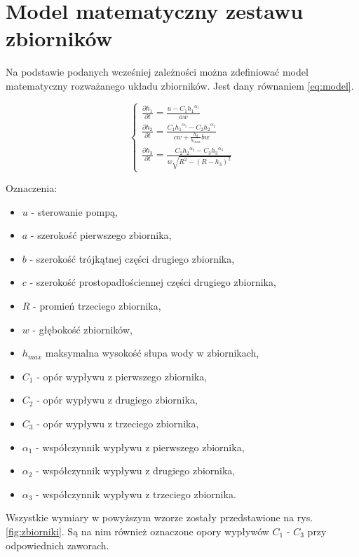 \section{Model matematyczny zestawu zbiorników}
\label{sec:model}

Na podstawie podanych wcześniej zależności można zdefiniować model matematyczny rozważanego układu zbiorników.
Jest dany równaniem \ref{eq:model}.

\begin{equation}\label{eq:model}
\left \{
\begin{array}{lr}
\frac{\partial h_{1}}{\partial t} = \frac{u - C_{1}{h_{1}}^{\alpha_{1}}}{aw} \\[8pt]
\frac{\partial h_{2}}{\partial t} = \frac{C_{1}{h_{1}}^{\alpha_{1}} -  C_{2}{h_{2}}^{\alpha_{2}}}{cw + \frac{h_{2}}{h_{max}}bw} \\[20pt]
\frac{\partial h_{3}}{\partial t} = \frac{C_{2}{h_{2}}^{\alpha_{2}} -  C_{3}{h_{3}}^{\alpha_{3}}}{w\sqrt{R^{2} - (R - h_{3})^{2}}}
\end{array}
\right.
\end{equation}

Oznaczenia:
\begin{itemize}
    \item $u$ - sterowanie pompą,
    \item $a$ - szerokość pierwszego zbiornika,
    \item $b$ - szerokość trójkątnej części drugiego zbiornika,
    \item $c$ - szerokość prostopadłościennej części drugiego zbiornika,
    \item $R$ - promień trzeciego zbiornika,
    \item $w$ - głębokość zbiorników,
    \item $h_{max}$ maksymalna wysokość słupa wody w zbiornikach,
    \item $C_{1}$ - opór wypływu z pierwszego zbiornika,
    \item $C_{2}$ - opór wypływu z drugiego zbiornika,
    \item $C_{3}$ - opór wypływu z trzeciego zbiornika,
    \item $\alpha_{1}$ - współczynnik wypływu z pierwszego zbiornika,
    \item $\alpha_{2}$ - współczynnik wypływu z drugiego zbiornika,
    \item $\alpha_{3}$ - współczynnik wypływu z trzeciego zbiornika.
\end{itemize}
Wszystkie wymiary w powyższym wzorze zostały przedstawione na rys. \ref{fig:zbiorniki}. Są na nim również oznaczone opory wypływów $C_{1}$ - $C_{3}$ przy odpowiednich zaworach.
